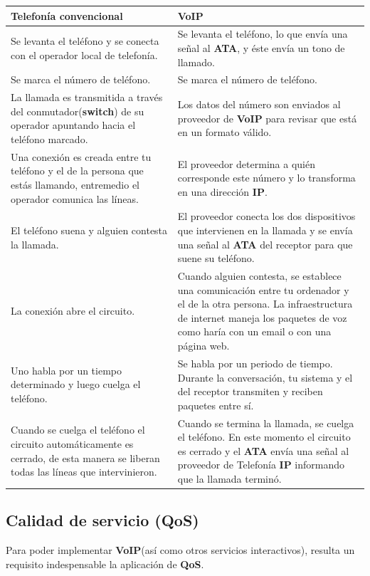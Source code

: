\documentclass[a4paper, 11pt]{article} %
\begin{document}
		\begin{tabular}{|p{6cm}|p{6cm}|}
			\hline
			\textbf{Telefonía convencional} & \textbf{VoIP} \\
			\hline \hline
			Se levanta el teléfono y se conecta con el operador local de telefonía. & Se levanta el teléfono, lo que envía una señal al \textbf{ATA}, y éste envía un tono de llamado. \\
			\hline
			Se marca el número de teléfono. & Se marca el número de teléfono. \\
			\hline
			La llamada es transmitida a través del conmutador(\textbf{switch}) de su operador apuntando hacia el teléfono marcado. & Los datos del número son enviados al proveedor de \textbf{VoIP} para revisar que está en un formato válido. \\
			\hline
			Una conexión es creada entre tu teléfono y el de la persona que estás llamando, entremedio el operador comunica las líneas. & El proveedor determina a quién corresponde este número y lo transforma en una dirección \textbf{IP}. \\
			\hline
			El teléfono suena y alguien contesta la llamada. & El proveedor conecta los dos dispositivos que intervienen en la llamada y se envía una señal al \textbf{ATA} del receptor para que suene su teléfono. \\
			\hline
			La conexión abre el circuito. & Cuando alguien contesta, se establece una comunicación entre tu ordenador y el de la otra persona. La infraestructura de internet maneja los paquetes de voz como haría con un email o con una página web. \\
			\hline
			Uno habla por un tiempo determinado y luego cuelga el teléfono. & Se habla por un periodo de tiempo. Durante la conversación, tu sistema y el del receptor transmiten y reciben paquetes entre sí. \\
			\hline
			Cuando se cuelga el teléfono el circuito automáticamente es cerrado, de esta manera se liberan todas las líneas que intervinieron. & Cuando se termina la llamada, se cuelga el teléfono. En este momento el circuito es cerrado y el \textbf{ATA} envía una señal al proveedor de Telefonía \textbf{IP} informando que la llamada terminó. \\
			\hline
		\end{tabular}
		\label{tabla:vs}
		
		\subsection{Calidad de servicio (QoS)}
		Para poder implementar \textbf{VoIP}(así como otros servicios interactivos), resulta un requisito indespensable la aplicación de \textbf{QoS}.
		
\end{document}
